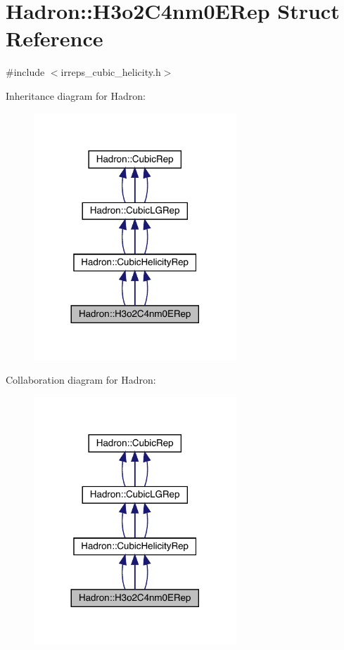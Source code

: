 \hypertarget{structHadron_1_1H3o2C4nm0ERep}{}\section{Hadron\+:\+:H3o2\+C4nm0\+E\+Rep Struct Reference}
\label{structHadron_1_1H3o2C4nm0ERep}


{\ttfamily \#include $<$irreps\+\_\+cubic\+\_\+helicity.\+h$>$}



Inheritance diagram for Hadron\+:
\nopagebreak
\begin{figure}[H]
\begin{center}
\leavevmode
\includegraphics[width=216pt]{db/dd1/structHadron_1_1H3o2C4nm0ERep__inherit__graph}
\end{center}
\end{figure}


Collaboration diagram for Hadron\+:
\nopagebreak
\begin{figure}[H]
\begin{center}
\leavevmode
\includegraphics[width=216pt]{dd/d3d/structHadron_1_1H3o2C4nm0ERep__coll__graph}
\end{center}
\end{figure}

